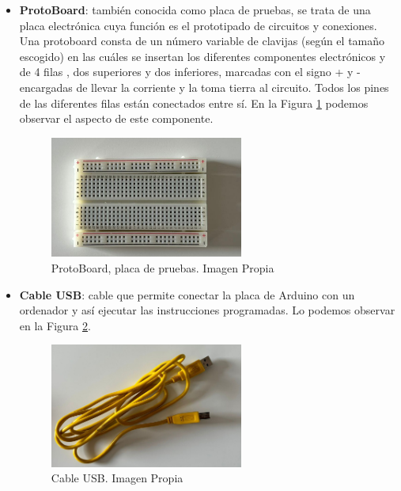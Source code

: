 \begin{itemize}
    \item \textbf{ProtoBoard}: también conocida como placa de pruebas, se trata de una placa electrónica cuya función es el prototipado de circuitos y conexiones. Una protoboard consta de un número variable de clavijas (según el tamaño escogido) en las cuáles se insertan los diferentes componentes electrónicos y de 4 filas , dos superiores y dos inferiores, marcadas con el signo + y - encargadas de llevar la corriente y la toma tierra al circuito. Todos los pines de las diferentes filas están conectados entre sí. En la Figura \ref{fig:protoboard} podemos observar el aspecto de este componente.
    \begin{figure}[h]
    \centering
    \includegraphics[width=0.6\textwidth]{img/proto.jpg}
    \caption{ProtoBoard, placa de pruebas. Imagen Propia}
    \label{fig:protoboard}
\end{figure}

    \item \textbf{Cable USB}: cable que permite conectar la placa de Arduino con un ordenador y así ejecutar las instrucciones programadas. Lo podemos observar en la Figura \ref{fig:USB}.
    \begin{figure}[h]
    \centering
    \includegraphics[width=0.6\textwidth]{img/usb.jpg}
    \caption{Cable USB. Imagen Propia}
    \label{fig:USB}
\end{figure}


\end{itemize}
